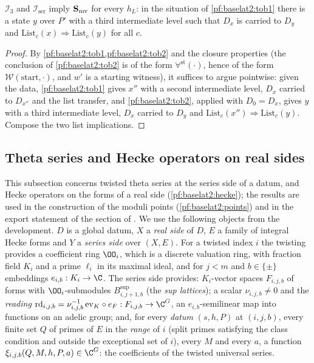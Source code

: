 \begin{proposition}\label{pf:baselat2:mvbase}
$\mathcal I_3$ and $\mathcal I_{\mathrm{ser}}$ imply $\mathbf{S}_{\mathrm{mv}}$ for every $h_L$: in the situation of
\cref{pf:baselat2:tob1} there is a state $y$ over $P'$ with a third intermediate level such that $D_x$ is
carried to $D_y$ and $\mathrm{List}_c(x)\Rightarrow\mathrm{List}_c(y)$ for all $c$.
\end{proposition}

\begin{proof}
By \cref{pf:baselat2:tob1,pf:baselat2:tob2} and the closure properties (the conclusion of
\cref{pf:baselat2:tob2} is of the form $\forall^{\mathrm{st}}(\cdot)$, hence of the form $\mathcal W(\mathrm{start},\cdot)$, and
$w'$ is a starting witness), it suffices to argue pointwise: given the data, \cref{pf:baselat2:tob1} gives
$x''$ with a second intermediate level, $D_x$ carried to $D_{x''}$ and the list transfer, and
\cref{pf:baselat2:tob2}, applied with $D_0=D_x$, gives $y$ with a third intermediate level, $D_x$ carried to
$D_y$ and $\mathrm{List}_c(x'')\Rightarrow\mathrm{List}_c(y)$. Compose the two list implications.
\end{proof}

\subsection{Theta series and Hecke operators on real sides}\label{sec:pf:baselat2:theta}

This subsection concerns twisted theta series at the series side of a datum, and Hecke operators on the forms
of a real side (\cref{pf:baselat2:hecke}); the results are used in the construction of the moduli points
(\cref{pf:baselat2:points}) and in the export statement of the section of
. We use the following objects from the
development. $D$ is a global datum, $X$ a \emph{real side} of $D$,
$E$ a family of integral Hecke forms and $Y$ a \emph{series side} over $(X,E)$.
For a twisted index $i$ the twisting provides a coefficient ring
$\OO_i$, which is a discrete valuation ring, with fraction field $K_i$ and a prime $\ell_i$ in its maximal
ideal, and for $j<m$ and $b\in\{\pm\}$ embeddings $e_{i,b}:K_i\to\C$. The series side provides: $K_i$-vector
spaces $F_{i,j,b}$ of forms with $\OO_i$-submodules $B^{\sup}_{i,j+1,b}$ (the \emph{sup lattices}); a scalar
$\nu_{i,j,b}\neq0$ and the \emph{reading} $\mathrm{rd}_{i,j,b}=\nu_{i,j,b}^{-1}\,\mathrm{ev}_K\circ e_F:F_{i,j,b}\to\C^{G}$, an
$e_{i,b}$-semilinear map into functions on an adelic group; and, for every \emph{datum} $(s,h,P)$ at
$(i,j,b)$, every finite set $Q$ of primes of $E$ in the \emph{range} of $i$ (split primes satisfying
the class condition and outside the exceptional set of $i$), every $M$ and every $a$, a function
$\xi_{i,j,b}(Q,M,h,P,a)\in\C^G$: the coefficients of the twisted universal series.


